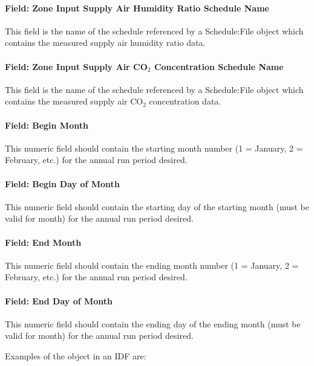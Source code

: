 \paragraph{Field: Zone Input Supply Air Humidity Ratio Schedule Name}\label{field-zone-input-supply-air-humidity-ratio-schedule-name-hm}
This field is the name of the schedule referenced by a Schedule:File object which contains the measured supply air humidity ratio data.

\paragraph{Field: Zone Input Supply Air CO$_2$ Concentration Schedule Name}\label{field-zone-input-supply-air-co2-concentration-schedule-name-hm}
This field is the name of the schedule referenced by a Schedule:File object which contains the measured supply air CO$_2$ concentration data.

\paragraph{Field: Begin Month}\label{field-begin-month-hm}
This numeric field should contain the starting month number (1 = January, 2 = February, etc.) for the annual run period desired.

\paragraph{Field: Begin Day of Month}\label{field-begin-day-of-month-hm}
This numeric field should contain the starting day of the starting month (must be valid for month) for the annual run period desired.

\paragraph{Field: End Month}\label{field-end-month-hm}
This numeric field should contain the ending month number (1 = January, 2 = February, etc.) for the annual run period desired.

\paragraph{Field: End Day of Month}\label{field-end-day-of-month-hm}
This numeric field should contain the ending day of the ending month (must be valid for month) for the annual run period desired.

Examples of the object in an IDF are:

